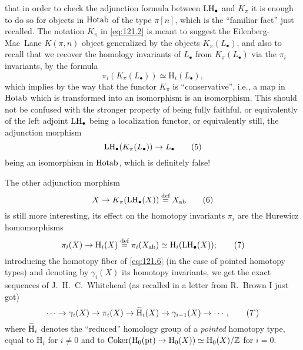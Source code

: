 that in order to check the adjunction formula between $\operatorname{LH}_\bullet$ and
$K_\pi$ it is enough to do so for objects in $\operatorname{Hotab}$ of the type
$\pi[n]$, which is the ``familiar fact'' just recalled. The notation
$K_\pi$ in \eqref{eq:121.2} is meant to suggest the Eilenberg-Mac~Lane
$K(\pi,n)$ object generalized by the objects $K_\pi(L_\bullet)$, and
also to recall that we recover the homology invariants of $L_\bullet$
from $K_\pi(L_\bullet)$ via the $\pi_i$ invariants, by the formula
\begin{equation}
  \label{eq:121.4}
  \pi_i(K_\pi(L_\bullet))\simeq\mathrm H_i(L_\bullet),\tag{4}
\end{equation}
which implies by the way that the functor $K_\pi$ is ``conservative'',
i.e., a map in $\operatorname{Hotab}$ which is transformed into an isomorphism is
an isomorphism. This should not be confused with the stronger property
of being fully faithful, or equivalently of the left adjoint
$\operatorname{LH}_\bullet$ being a localization functor, or equivalently still, the
adjunction morphism
\begin{equation}
  \label{eq:121.5}
  \operatorname{LH}_\bullet(K_\pi(L_\bullet))\to L_\bullet\tag{5}
\end{equation}
being an isomorphism in $\operatorname{Hotab}$, which is definitely false!

The other adjunction morphism
\begin{equation}
  \label{eq:121.6}
  X\to K_\pi(\operatorname{LH}_\bullet(X)) \overset{\textup{def}}{=} X_{\mathrm{ab}}\tag{6}
\end{equation}
is still more interesting, its effect on the homotopy invariants
$\pi_i$ are the Hurewicz homomorphisms
\begin{equation}
  \label{eq:121.7}
  \pi_i(X)\to \mathrm H_i(X) \overset{\textup{def}}{=} \pi_i(X_{\mathrm{ab}}) \simeq \mathrm
  H_i(\operatorname{LH}_\bullet(X));\tag{7} 
\end{equation}
introducing the homotopy fiber of \eqref{eq:121.6} (in the case of
pointed homotopy types) and denoting by $\gamma_i(X)$ its homotopy
invariants, we get the exact sequences of J.~H.~C.~Whitehead (as
recalled in a letter from R.~Brown I just got)
\begin{equation}
  \label{eq:121.7prime}
  \cdots \to\gamma_i(X) \to \pi_i(X) \to \operatorname{\widetilde H}_i(X) \to
  \gamma_{i-1}(X) \to \cdots,\tag{7'}
\end{equation}
where $\operatorname{\widetilde H}_i$ denotes the ``reduced'' homology group of a
\emph{pointed} homotopy type, equal to $\mathrm H_i$ for $i\ne0$ and
to $\operatorname{Coker}(\mathrm H_0(\mathrm{pt}) \to \mathrm H_0(X))\simeq \mathrm
H_0(X)/{\mathbb{Z}}$ for $i=0$.

